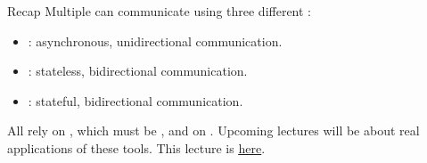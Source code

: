 
\begin{frame}{Recap}
  Multiple  can communicate using three different :
  \begin{itemize}
    \item {}: asynchronous, unidirectional communication.
    \item {}: stateless, bidirectional communication.
    \item {}: stateful, bidirectional communication.
  \end{itemize}
  All rely on , which must be , and on .
  \newline\newline
  Upcoming lectures will be  about real applications of these tools.
  \newline\newline
  \newline\newline
  This lecture is \href{https://github.com/robmasocco/DAFN23_Robotics_4}{\color{blue}\underline{here}}.
\end{frame}
